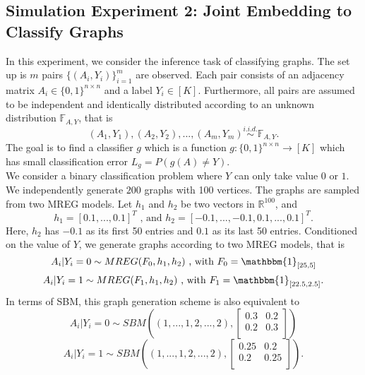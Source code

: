 \documentclass[10pt,journal,compsoc]{IEEEtran}
\begin{document}
\subsection{Simulation Experiment 2: Joint Embedding to Classify Graphs}
In this experiment, we consider the inference task of classifying graphs.  The set up is $m$ pairs $\{(A_i,Y_i)\}_{i=1}^{m}$ are observed. Each pair consists of an adjacency matrix $A_i \in \{0,1\}^{n \times n}$ and a label $Y_i \in [K]$. Furthermore, all pairs are assumed to be independent and identically distributed according to an unknown distribution $\mathbb{F}_{A,Y}$, that is
\[(A_1,Y_1),(A_2,Y_2),...,(A_m,Y_m) \overset{i.i.d.}{\sim} \mathbb{F}_{A,Y}. \] 
The goal is to find a classifier $g$ which is a function $g:\{0,1\}^{n \times n} \rightarrow [K]$ which has small classification error $L_g=P(g(A)\neq Y)$. \\ 

\noindent We consider a binary classification problem where $Y$ can only take value $0$ or $1$. We independently generate $200$ graphs with 100 vertices. The graphs are sampled from two MREG models. Let $h_1$ and $h_2$ be two vectors in $\mathbb{R}^{100}$, and \[h_1=[0.1,...,0.1]^T \text{ , and } h_2=[-0.1,...,-0.1,0.1,...,0.1]^T. \] 
Here, $h_2$ has $-0.1$ as its first 50 entries and $0.1$ as its last 50 entries. Conditioned on the value of $Y$, we generate graphs according to two MREG models, that is 
\[A_i|Y_i=0 \sim MREG(F_0,h_1,h_2) \text{ , with } F_0= \mathbbm{1}_{[25,5]} \]
\[A_i|Y_i=1 \sim MREG(F_1,h_1,h_2) \text{ , with } F_1= \mathbbm{1}_{[22.5,2.5]}. \]
In terms of SBM, this graph generation scheme is also equivalent to
\[ A_i|Y_i=0 \sim  SBM((1,...,1,2,...,2),\begin{bmatrix} 0.3 & 0.2 \\ 0.2 & 0.3 \\ \end{bmatrix})  \]
\[ A_i|Y_i=1 \sim  SBM((1,...,1,2,...,2),\begin{bmatrix} 0.25 & 0.2 \\ 0.2 & 0.25 \\ \end{bmatrix}).\]
\end{document}
